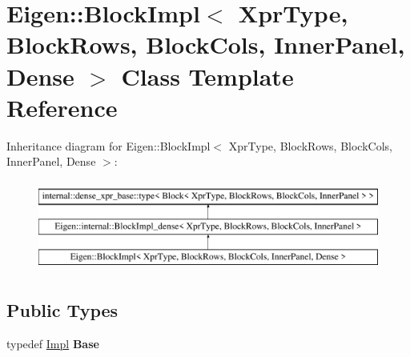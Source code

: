 \hypertarget{class_eigen_1_1_block_impl_3_01_xpr_type_00_01_block_rows_00_01_block_cols_00_01_inner_panel_00_01_dense_01_4}{}\section{Eigen\+::Block\+Impl$<$ Xpr\+Type, Block\+Rows, Block\+Cols, Inner\+Panel, Dense $>$ Class Template Reference}
\label{class_eigen_1_1_block_impl_3_01_xpr_type_00_01_block_rows_00_01_block_cols_00_01_inner_panel_00_01_dense_01_4}
Inheritance diagram for Eigen\+::Block\+Impl$<$ Xpr\+Type, Block\+Rows, Block\+Cols, Inner\+Panel, Dense $>$\+:\begin{figure}[H]
\begin{center}
\leavevmode
\includegraphics[height=3.000000cm]{class_eigen_1_1_block_impl_3_01_xpr_type_00_01_block_rows_00_01_block_cols_00_01_inner_panel_00_01_dense_01_4}
\end{center}
\end{figure}
\subsection*{Public Types}
\begin{DoxyCompactItemize}
\item 
\mbox{\label{class_eigen_1_1_block_impl_3_01_xpr_type_00_01_block_rows_00_01_block_cols_00_01_inner_panel_00_01_dense_01_4_a6343ad315fba432c3ccfccbcae23de9b}} 
typedef \mbox{\hyperlink{class_eigen_1_1internal_1_1_block_impl__dense}{Impl}} {\bfseries Base}
\end{DoxyCompactItemize}
